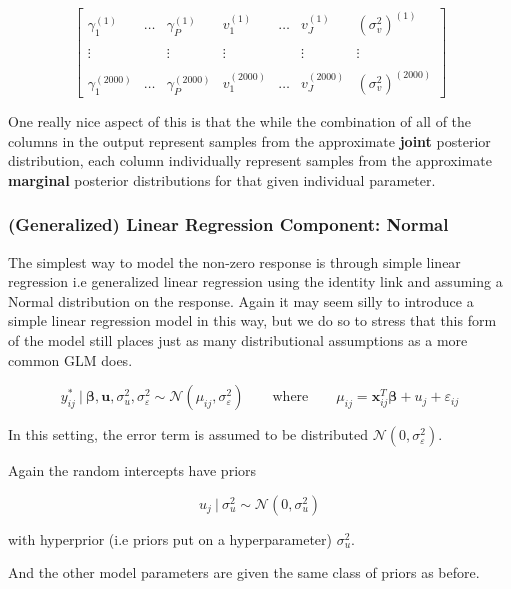 \documentclass[12pt,twoside]{reedthesis}
\begin{document}
\[
\begin{bmatrix}
  \gamma_1^{(1)} & \dots & \gamma_P^{(1)} & v_1^{(1)} & \dots & v_J^{(1)}  & (\sigma_{v}^2)^{(1)} \\
  \\ \vdots   &  & \vdots  & \vdots & &  \vdots & \vdots  \\ \\
  \gamma_1^{(2000)} & \dots &\gamma_P^{(2000)} & v_1^{(2000)}& \dots & v_J^{(2000)} & (\sigma_{v}^2)^{(2000)}
\end{bmatrix}
\]

One really nice aspect of this is that the while the combination of all of the columns in the output represent samples from the approximate \textbf{joint} posterior distribution, each column individually represent samples from the approximate \textbf{marginal} posterior distributions for that given individual parameter.

\hypertarget{generalized-linear-regression-component-normal}{%
\subsubsection{(Generalized) Linear Regression Component: Normal}\label{generalized-linear-regression-component-normal}}

The simplest way to model the non-zero response is through simple linear regression i.e generalized linear regression using the identity link and assuming a Normal distribution on the response. Again it may seem silly to introduce a simple linear regression model in this way, but we do so to stress that this form of the model still places just as many distributional assumptions as a more common GLM does.

\[
y^*_{ij} \ | \ \boldsymbol{\beta}, \boldsymbol{u}, \sigma_{u}^2,  \sigma_{\varepsilon}^2 \sim \mathcal{N}(\mu_{ij}, \sigma_{\varepsilon}^2) \qquad \text{where} \qquad \mu_{ij} = \mathbf{x}_{ij}^T\boldsymbol{\beta} + u_j + \varepsilon_{ij}
\]

In this setting, the error term is assumed to be distributed \(\mathcal{N}(0, \sigma_{\varepsilon}^2)\).

Again the random intercepts have priors

\[
u_j \ | \ \sigma_{u}^2 \sim \mathcal{N}(0, \sigma_{u}^2)
\]

with hyperprior (i.e priors put on a hyperparameter) \(\sigma_{u}^2\).

And the other model parameters are given the same class of priors as before.
\end{document}
